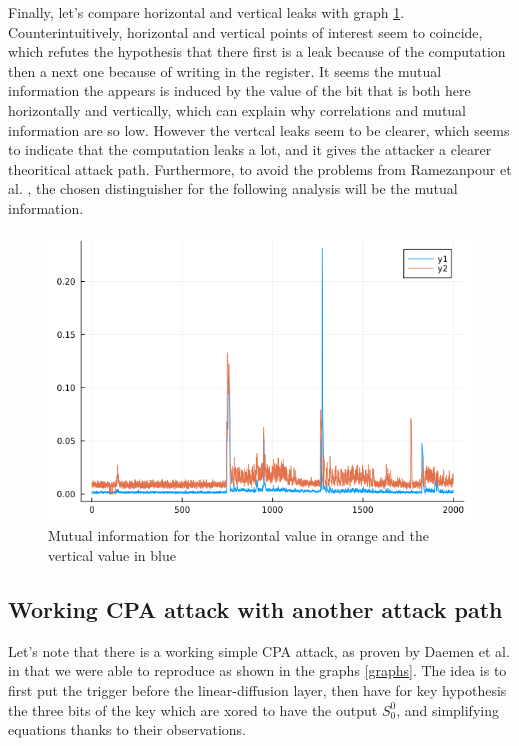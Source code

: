 \documentclass[a4paper,11pt,twocolumn]{article}
\begin{document}
		Finally, let's compare horizontal and vertical leaks with graph \ref{hvval}. Counterintuitively, horizontal and vertical points of interest seem to coincide, which refutes the hypothesis that there first is a leak because of the computation then a next one because of writing in the register. It seems the mutual information the appears is induced by the value of the bit that is both here horizontally and vertically, which can explain why correlations and mutual information are so low. However the vertcal leaks seem to be clearer, which seems to indicate that the computation leaks a lot, and it gives the attacker a clearer theoritical attack path. Furthermore, to avoid the problems from Ramezanpour et al. \cite{dl_cpa}, the chosen distinguisher for the following analysis will be the mutual information.
		
		\begin{figure}[h]
			\centering
			\includegraphics[scale=0.3]{h_and_v_one_byte}
			\caption{Mutual information for the horizontal value in orange and the vertical value in blue}
			\label{hvval}
		\end{figure}
		
		\subsection{Working CPA attack with another attack path}
		Let's note that there is a working simple CPA attack, as proven by Daemen et al. in \cite{cpa_lin} that we were able to reproduce as shown in the graphs \ref{graphs}. The idea is to first put the trigger before the linear-diffusion layer, then have for key hypothesis the three bits of the key which are xored to have the output $S_0^0$, and simplifying equations thanks to their observations.
		
\end{document}
